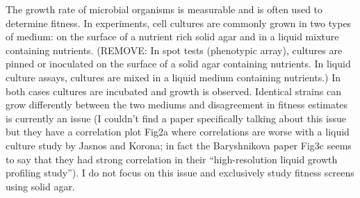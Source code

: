 The growth rate of microbial organisms is measurable and is often used
to determine fitness. In experiments, cell cultures are commonly grown
in two types of medium: on the surface of a nutrient rich solid agar
and in a liquid mixture containing nutrients. (REMOVE: In spot tests
(phenotypic array), cultures are pinned or inoculated on the surface
of a solid agar containing nutrients. In liquid culture assays,
cultures are mixed in a liquid medium containing nutrients.) In both
cases cultures are incubated and growth is observed. Identical strains
can grow differently between the two mediums and disagreement in
fitness estimates is currently an issue \citet{Baryshnikova2010} (I
couldn't find a paper specifically talking about this issue but they
have a correlation plot Fig2a where correlations are worse with a
liquid culture study by Jasnos and Korona; in fact the Baryshnikova
paper Fig3c seems to say that they had strong correlation in their
``high-resolution liquid growth profiling study''). I do not focus on
this issue and exclusively study fitness screens using solid agar.






